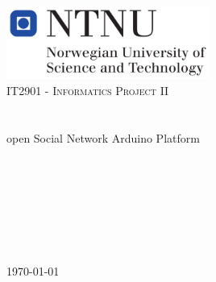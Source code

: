 \begin{titlepage}
	\begin{center}
		\includegraphics[width=0.5\textwidth]{img/NTNU-logo.png}\\[1cm]    
		\textsc{\Large IT2901 - Informatics Project II}\\[0.5cm]
		\HRule \\[0.6cm]
		{ \huge \bfseries \project}\\[0.4cm]
		open Social Network Arduino Platform
		\HRule \\[1.5cm]
		\begin{center} \large
			\anders \\
			\henrik \\
			\johan \\
			\asbjorn \\
			\emanuele \\
			\jonas \\
			\bjornar
		\end{center}
		\vfill
		{\large \today}
	\end{center}
\end{titlepage}

